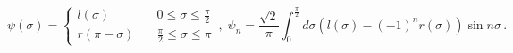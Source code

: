 \begin{equation}
\psi (\sigma )=\left\{ 
\begin{array}{lc}
l(\sigma ) & \quad 0\leq \sigma \leq {\frac{\pi }{2}} \\ 
r(\pi -\sigma ) & \quad {\frac{\pi }{2}}\leq \sigma \leq \pi
\end{array}
\right. \,,\;\psi _{n}={\frac{\sqrt{2}}{\pi }}\int_{0}^{\frac{\pi }{2}%
}d\sigma (l(\sigma )-(-1)^{n}r(\sigma ))\sin n\sigma \,.  \label{eq:psilrExp}
\end{equation}

